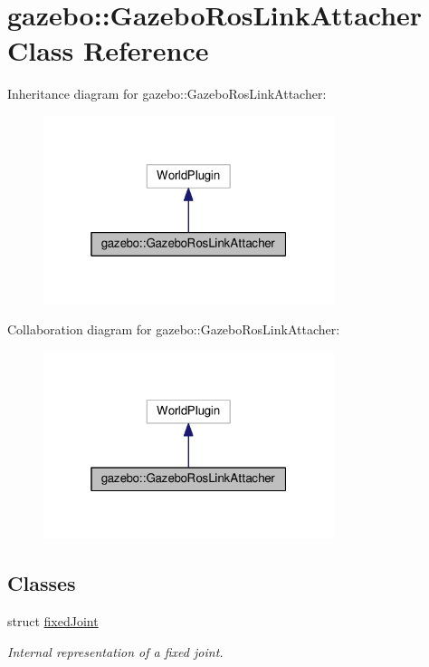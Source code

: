 \hypertarget{classgazebo_1_1GazeboRosLinkAttacher}{}\section{gazebo\+:\+:Gazebo\+Ros\+Link\+Attacher Class Reference}
\label{classgazebo_1_1GazeboRosLinkAttacher}


Inheritance diagram for gazebo\+:\+:Gazebo\+Ros\+Link\+Attacher\+:\nopagebreak
\begin{figure}[H]
\begin{center}
\leavevmode
\includegraphics[width=241pt]{d9/d98/classgazebo_1_1GazeboRosLinkAttacher__inherit__graph}
\end{center}
\end{figure}


Collaboration diagram for gazebo\+:\+:Gazebo\+Ros\+Link\+Attacher\+:\nopagebreak
\begin{figure}[H]
\begin{center}
\leavevmode
\includegraphics[width=241pt]{dc/da6/classgazebo_1_1GazeboRosLinkAttacher__coll__graph}
\end{center}
\end{figure}
\subsection*{Classes}
\begin{DoxyCompactItemize}
\item 
struct \hyperlink{structgazebo_1_1GazeboRosLinkAttacher_1_1fixedJoint}{fixed\+Joint}
\begin{DoxyCompactList}\small\item\em Internal representation of a fixed joint. \end{DoxyCompactList}\end{DoxyCompactItemize}
